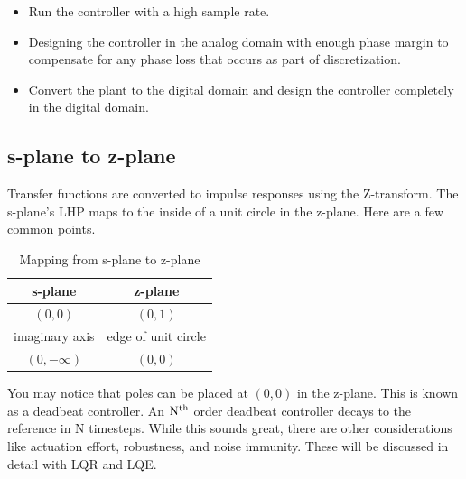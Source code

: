\begin{itemize}
  \item Run the controller with a high sample rate.
  \item Designing the controller in the analog domain with enough phase margin
    to compensate for any phase loss that occurs as part of discretization.
  \item Convert the \gls{plant} to the digital domain and design the controller
    completely in the digital domain.
\end{itemize}

\subsection{s-plane to z-plane}

Transfer functions are converted to impulse responses using the Z-transform. The
s-plane's LHP maps to the inside of a unit circle in the z-plane. Here are a few
common points.

\begin{table}
  \caption{Mapping from s-plane to z-plane}
  \renewcommand{\arraystretch}{1.3}
  \centering
  \begin{tabular}{|cc|}
    \hline
    \rowcolor{lightblue}
    \textbf{s-plane} & \textbf{z-plane} \\
    \hline
    $(0, 0)$ & $(0, 1)$ \\
    imaginary axis & edge of unit circle \\
    $(0, -\infty)$ & $(0, 0)$ \\
    \hline
  \end{tabular}
  \label{tab:s-plane2z-plane}
\end{table}

You may notice that poles can be placed at $(0, 0)$ in the z-plane. This is
known as a deadbeat controller. An $\rm N^{th}$ order deadbeat controller decays
to the \gls{reference} in N timesteps. While this sounds great, there are other
considerations like actuation effort, \gls{robustness}, and
\gls{noise immunity}. These will be discussed in detail with LQR and LQE.
